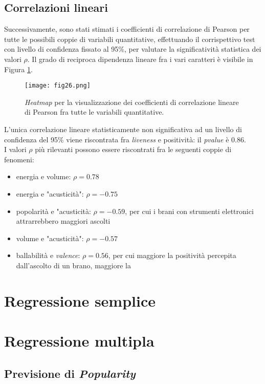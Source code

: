 \documentclass[fleqn,10pt]{SelfArx} %
\begin{document}
\subsection{Correlazioni lineari}
Successivamente, sono stati stimati i coefficienti di correlazione di Pearson per tutte le possibili coppie di variabili quantitative, effettuando il corrispettivo test con livello di confidenza fissato al 95\%, per valutare la significatività statistica dei valori $\rho$. Il grado di reciproca dipendenza lineare fra i vari caratteri è visibile in Figura \ref{fig:fig26}.
\begin{figure}[H]
    \centering
    \texttt{[image: fig26.png]}
    \label{fig:fig26}
    \caption{\textit{Heatmap} per la visualizzazione dei coefficienti di correlazione lineare di Pearson fra tutte le variabili quantitative.}
\end{figure}
L'unica correlazione lineare statisticamente non significativa ad un livello di confidenza del 95\% viene riscontrata fra \textit{liveness} e positività: il \textit{pvalue} è 0.86.\\
I valori $\rho$ più rilevanti possono essere riscontrati fra le seguenti coppie di fenomeni:
\begin{itemize}
    \item energia e volume: $\rho=0.78$ 
    \item energia e "acusticità": $\rho=-0.75$
    \item popolarità e "acusticità: $\rho=-0.59$, per cui i brani con strumenti elettronici attrarrebbero maggiori ascolti
    \item volume e "acusticità": $\rho=-0.57$
    \item ballabilità e \textit{valence}: $\rho=0.56$, per cui maggiore la positività percepita dall'ascolto di un brano, maggiore la 
\end{itemize}
\section{Regressione semplice}

\section{Regressione multipla}
\subsection{Previsione di \textit{Popularity}}
\end{document}
